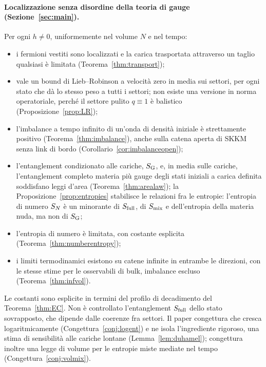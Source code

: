 \documentclass[11pt]{article}
\theoremstyle{stmtplain}
\theoremstyle{stmtdef}
\begin{document}
\paragraph{Localizzazione senza disordine della teoria di gauge (Sezione~\ref{sec:main}).}
Per ogni $h\neq0$, uniformemente nel volume $N$ e nel tempo:
\begin{itemize}[leftmargin=1.5em]
\item i fermioni vestiti sono localizzati e la carica trasportata attraverso un taglio qualsiasi è limitata
  (Teorema~\ref{thm:transport});
\item vale un bound di Lieb--Robinson a velocità zero in media sui settori, per ogni stato che dà lo stesso peso a
  tutti i settori; non esiste una versione in norma operatoriale, perché il settore pulito $q\equiv1$ è balistico
  (Proposizione~\ref{prop:LR});
\item l'imbalance a tempo infinito di un'onda di densità iniziale è strettamente positivo
  (Teorema~\ref{thm:imbalance}), anche sulla catena aperta di SKKM senza link di bordo
  (Corollario~\ref{cor:imbalanceopen});
\item l'entanglement condizionato alle cariche, $S_{\mathrm{G}}$, e, in media sulle cariche, l'entanglement completo materia
  più gauge degli stati iniziali a carica definita soddisfano leggi d'area (Teorema~\ref{thm:arealaw}); la
  Proposizione~\ref{prop:entropies} stabilisce le relazioni fra le entropie: l'entropia di numero $S_{N}$ è un
  minorante di $S_{\mathrm{full}}$, di $S_{\mathrm{mix}}$ e dell'entropia della materia nuda, ma non di $S_{\mathrm{G}}$;
\item l'entropia di numero è limitata, con costante esplicita (Teorema~\ref{thm:numberentropy});
\item i limiti termodinamici esistono su catene infinite in entrambe le direzioni, con le stesse stime per le
  osservabili di bulk, imbalance escluso (Teorema~\ref{thm:infvol}).
\end{itemize}
Le costanti sono esplicite in termini del profilo di decadimento del Teorema~\ref{thm:EC}. Non è controllato
l'entanglement $S_{\mathrm{full}}$ dello stato sovrapposto, che dipende dalle coerenze fra settori. Il paper congettura che
cresca logaritmicamente (Congettura~\ref{conj:logent}) e ne isola l'ingrediente rigoroso, una stima di sensibilità
alle cariche lontane (Lemma~\ref{lem:duhamel}); congettura inoltre una legge di volume per le entropie miste mediate
nel tempo (Congettura~\ref{conj:volmix}).
\end{document}
